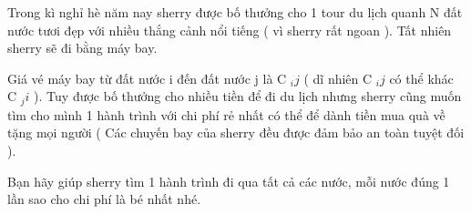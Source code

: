 Trong kì nghỉ hè năm nay sherry được bố thưởng cho 1 tour du lịch quanh N đất nước tươi đẹp với nhiều thắng cảnh nổi tiếng ( vì sherry rất ngoan ). Tất nhiên sherry sẽ đi bằng máy bay.  

   Giá vé máy bay từ đất nước i đến đất nước j là C   $_    ij   $   ( dĩ nhiên C   $_    ij   $   có thể khác C   $_    ji   $   ). Tuy được bố thưởng cho nhiều tiền để đi du lịch nhưng sherry cũng muốn tìm cho mình 1 hành trình với chi phí rẻ nhất có thể để dành tiền mua quà về tặng mọi người  ( Các chuyến bay của sherry đều được đảm bảo an toàn tuyệt đối ).  

   Bạn hãy giúp sherry tìm 1 hành trình đi qua tất cả các nước, mỗi nước đúng 1 lần sao cho chi phí là bé nhất nhé.  

\